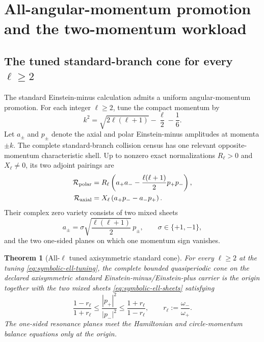 \documentclass[11pt]{article}
\newtheorem{theorem}{Theorem}[section]
\theoremstyle{definition}
\theoremstyle{remark}
\begin{document}
\section{All-angular-momentum promotion and the two-momentum workload}

\subsection{The tuned standard-branch cone for every \texorpdfstring{\(\ell\geq2\)}{ell >= 2}}

The standard Einstein-minus calculation admits a uniform angular-momentum
promotion.  For each integer \(\ell\geq2\), tune the compact momentum by
\begin{equation}\label{eq:symbolic-ell-tuning}
 k^2=\sqrt{2\ell(\ell+1)}-\frac{\ell}{2}-\frac16.
\end{equation}
Let \(a_\pm\) and \(p_\pm\) denote the axial and polar Einstein-minus
amplitudes at momenta \(\pm k\).  The complete standard-branch collision
census has one relevant opposite-momentum characteristic shell.  Up to
nonzero exact normalizations \(R_\ell>0\) and \(X_\ell\neq0\), its two
adjoint pairings are
\begin{align}
 \mathcal R_{\rm polar}
  &=R_\ell\left(a_+a_--\frac{\ell(\ell+1)}2p_+p_-\right),
  \label{eq:symbolic-ell-polar}\\
 \mathcal R_{\rm axial}
  &=X_\ell\left(a_+p_--a_-p_+\right).
  \label{eq:symbolic-ell-axial}
\end{align}
Their complex zero variety consists of two mixed sheets
\begin{equation}\label{eq:symbolic-ell-sheets}
 a_\pm=\sigma\sqrt{\frac{\ell(\ell+1)}2}\,p_\pm,
 \qquad \sigma\in\{+1,-1\},
\end{equation}
and the two one-sided planes on which one momentum sign vanishes.

\begin{theorem}[All-\(\ell\) tuned axisymmetric standard cone]
\label{thm:symbolic-ell-standard-cone}
For every \(\ell\geq2\) at the tuning \eqref{eq:symbolic-ell-tuning}, the
complete bounded quasiperiodic cone on the declared axisymmetric standard
Einstein-minus/Einstein-plus carrier is the origin together with the two
mixed sheets \eqref{eq:symbolic-ell-sheets} satisfying
\begin{equation}\label{eq:symbolic-ell-occupation-interval}
 \frac{1-r_\ell}{1+r_\ell}
 \leq \frac{|p_+|^2}{|p_-|^2}
 \leq \frac{1+r_\ell}{1-r_\ell},
 \qquad r_\ell:=\frac{\omega_-}{\omega_+}.
\end{equation}
The one-sided resonance planes meet the Hamiltonian and circle-momentum
balance equations only at the origin.
\end{theorem}
\end{document}
